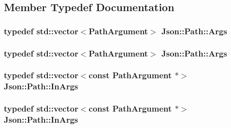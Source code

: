 \subsection{Member Typedef Documentation}
\hypertarget{classJson_1_1Path_a27d96232d034d7a78286468676f9cb3e}{
\subsubsection[{Args}]{\setlength{\rightskip}{0pt plus 5cm}typedef std\-::vector$<${\bf Path\-Argument}$>$ {\bf Json\-::\-Path\-::\-Args}\hspace{0.3cm}{\ttfamily [private]}}}\label{dc/d4c/classJson_1_1Path_a27d96232d034d7a78286468676f9cb3e}
\hypertarget{classJson_1_1Path_a27d96232d034d7a78286468676f9cb3e}{
\subsubsection[{Args}]{\setlength{\rightskip}{0pt plus 5cm}typedef std\-::vector$<${\bf Path\-Argument}$>$ {\bf Json\-::\-Path\-::\-Args}\hspace{0.3cm}{\ttfamily [private]}}}\label{dc/d4c/classJson_1_1Path_a27d96232d034d7a78286468676f9cb3e}
\hypertarget{classJson_1_1Path_a763349989466ac275fad176708378f95}{
\subsubsection[{In\-Args}]{\setlength{\rightskip}{0pt plus 5cm}typedef std\-::vector$<$const {\bf Path\-Argument} $\ast$$>$ {\bf Json\-::\-Path\-::\-In\-Args}\hspace{0.3cm}{\ttfamily [private]}}}\label{dc/d4c/classJson_1_1Path_a763349989466ac275fad176708378f95}
\hypertarget{classJson_1_1Path_a763349989466ac275fad176708378f95}{
\subsubsection[{In\-Args}]{\setlength{\rightskip}{0pt plus 5cm}typedef std\-::vector$<$const {\bf Path\-Argument} $\ast$$>$ {\bf Json\-::\-Path\-::\-In\-Args}\hspace{0.3cm}{\ttfamily [private]}}}\label{dc/d4c/classJson_1_1Path_a763349989466ac275fad176708378f95}


